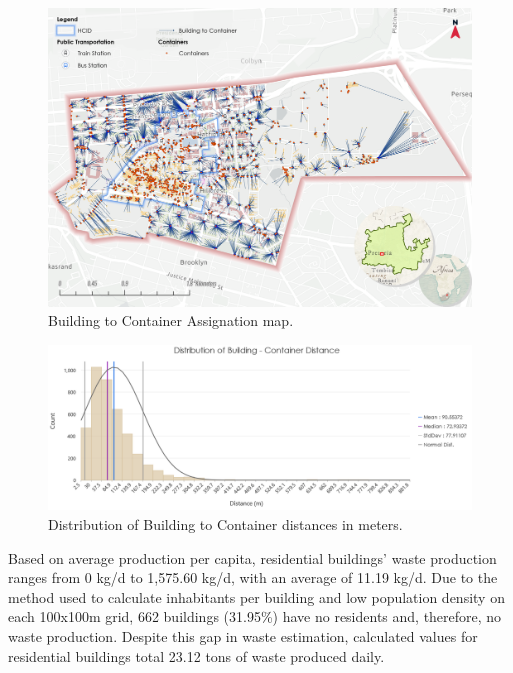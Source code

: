 \documentclass[authoryear,preprint,review,doubleblind, 12pt]{elsarticle}
\begin{document}
    \begin{figure}[!ht]
    \centering
    \includegraphics[width=1.2\linewidth]{Figures/Building to Container.png}
        \caption{Building to Container Assignation map.}
        \label{fig:closestCont}
    \end{figure}

    \begin{figure}[h!]
    \centering
        \includegraphics[width=\linewidth]{Figures/Building to container distance.png}
        \caption{Distribution of Building to Container distances in meters.}
        \label{fig:distances}
    \end{figure}

    Based on average production per capita, residential buildings' waste production ranges from 0 kg/d to 1,575.60 kg/d, with an average of 11.19 kg/d. Due to the method used to calculate inhabitants per building and low population density on each 100x100m grid, 662 buildings (31.95\%) have no residents and, therefore, no waste production. Despite this gap in waste estimation, calculated values for residential buildings total 23.12 tons of waste produced daily.
\end{document}
